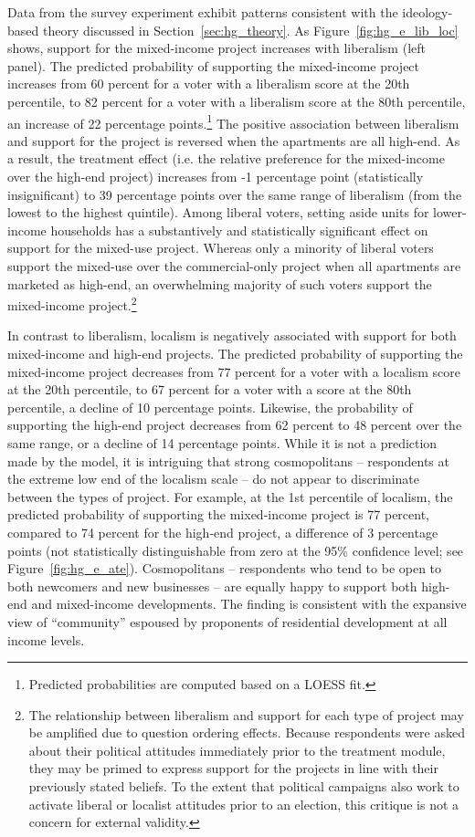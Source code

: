 \documentclass[article,12pt]{memoir}
\begin{document}
Data from the survey experiment exhibit patterns consistent with the ideology-based theory discussed in Section~\ref{sec:hg_theory}.  As Figure~\ref{fig:hg_e_lib_loc} shows, support for the mixed-income project increases with liberalism (left panel). The predicted probability of supporting the mixed-income project increases from 60 percent for a voter with a liberalism score at the 20th percentile, to 82 percent for a voter with a liberalism score at the 80th percentile, an increase of 22 percentage points.\footnote{Predicted probabilities are computed based on a LOESS fit.}  The positive association between liberalism and support for the  project is reversed when the apartments are all high-end.  As a result, the treatment effect (i.e. the relative preference for the mixed-income over the high-end project) increases from -1 percentage point (statistically insignificant) to 39 percentage points over the same range of liberalism (from the lowest to the highest quintile). Among liberal voters, setting aside units for lower-income households has a substantively and statistically significant effect on support for the mixed-use project. Whereas only a minority of liberal voters support the mixed-use over the commercial-only project when all apartments are marketed as high-end, an overwhelming majority of such voters support the mixed-income project.\footnote{The relationship between liberalism and support for each type of project may be amplified due to question ordering effects. Because respondents were asked about their political attitudes immediately prior to the treatment module, they may be primed to express support for the projects in line with their previously stated beliefs. To the extent that political campaigns also work to activate liberal or localist attitudes prior to an election, this critique is not a concern for external validity.}

In contrast to liberalism, localism is negatively associated with support for both mixed-income and high-end projects.  The predicted probability of supporting the mixed-income project decreases from 77 percent for a voter with a localism score at the 20th percentile, to 67 percent for a voter with a score at the 80th percentile, a decline of 10 percentage points.   Likewise, the probability of supporting the high-end project decreases from 62 percent to 48 percent over the same range, or a decline of 14 percentage points.  While it is not a prediction made by the model, it is intriguing that strong cosmopolitans -- respondents at the extreme low end of the localism scale -- do not appear to discriminate between the types of project.  For example, at the 1st percentile of localism, the predicted probability of supporting the mixed-income project is 77 percent, compared to 74 percent for the high-end project, a difference of 3 percentage points (not statistically distinguishable from zero at the 95\% confidence level; see Figure~\ref{fig:hg_e_ate}).  Cosmopolitans -- respondents who tend to be open to both newcomers and new businesses -- are equally happy to support both high-end and mixed-income developments. The finding is consistent with the expansive view of ``community'' espoused by proponents of residential development at all income levels.
\end{document}
